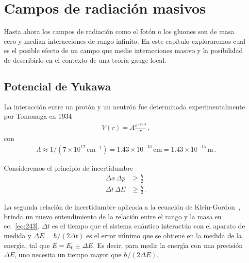 \chapter{Campos de radiación masivos}
\label{rupt-espont-de} %

Hasta ahora los campos de radiación como el fotón o los gluones son de masa cero y median interacciones de rango infinito.  En este capítulo exploraremos cual es el posible efecto de un campo que medie interacciones masivo y la posibilidad de describirlo en el contexto de una teoría gauge local.

\section{Potencial de Yukawa}

\begin{frame}
La interacci\'on entre un prot\'on y un neutr\'on fue determinada experimentalmente por Tomonaga en 1934 \cite{history}
\begin{align}
\label{eq:243}
  V(r)={A}\frac{e^{-r/\Lambda }}{r}\,,
\end{align}
con
\begin{align}
  \label{eq:245}
  \Lambda\approx1/(7\times10^{12}\,\text{cm}^{-1})=1.43\times10^{-13}\,\text{cm}=1.43\times10^{-15}\,\text{m}\,.
\end{align}
\end{frame}

\begin{frame}
Consideremos el principio de incertidumbre
\begin{align}
  \Delta x\, \Delta p &\geq \frac{\hbar}{2}\nonumber\\
\Delta t\, \Delta E&\geq\frac{\hbar}{2}\,.
\end{align}

La segunda relaci\'on de incertidumbre
aplicada a la ecuación de Klein-Gordon~\cite{Aitchison:2003tq}, brinda un nuevo entendimiento de la relaci\'on entre el rango y la masa en ec.~\eqref{eq:243}. $\Delta t$ es el tiempo que el sistema cu\'antico interact\'ua con el aparato de medida y $\Delta E=\hbar/(2\Delta t)$ es el error m\'\i nimo que se obtiene en la medida de la energ\'\i a, tal que $E=E_0\pm\Delta E$. Es decir, para medir la energ\'\i a con una precisi\'on $\Delta E$, uno necesita un tiempo mayor que $\hbar/(2\Delta E)$.
\end{frame}

